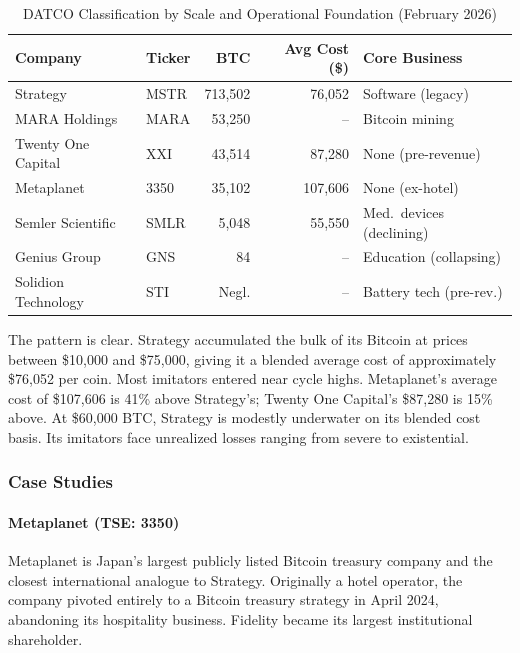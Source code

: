 \begin{table}[H]
\centering
\caption[DATCO Classification by Scale and Operational Foundation]{DATCO Classification by Scale and Operational Foundation (February 2026)}
\label{tab:datco_taxonomy}
\small
\begin{tabular}{@{}llrrl@{}}
\toprule
\textbf{Company} & \textbf{Ticker} & \textbf{BTC} & \textbf{Avg Cost (\$)} & \textbf{Core Business} \\
\midrule
Strategy & MSTR & 713,502 & 76,052 & Software (legacy) \\
MARA Holdings & MARA & 53,250 & -- & Bitcoin mining \\
Twenty One Capital & XXI & 43,514 & 87,280 & None (pre-revenue) \\
Metaplanet & 3350 & 35,102 & 107,606 & None (ex-hotel) \\
Semler Scientific & SMLR & 5,048 & 55,550 & Med.\ devices (declining) \\
Genius Group & GNS & 84 & -- & Education (collapsing) \\
Solidion Technology & STI & Negl. & -- & Battery tech (pre-rev.) \\
\bottomrule
\end{tabular}
\end{table}

The pattern is clear. Strategy accumulated the bulk of its Bitcoin at prices between \$10,000 and \$75,000, giving it a blended average cost of approximately \$76,052 per coin. Most imitators entered near cycle highs. Metaplanet's average cost of \$107,606 is 41\% above Strategy's; Twenty One Capital's \$87,280 is 15\% above. At \$60,000 BTC, Strategy is modestly underwater on its blended cost basis. Its imitators face unrealized losses ranging from severe to existential.

\subsubsection{Case Studies}

\paragraph{Metaplanet (TSE: 3350)}

Metaplanet is Japan's largest publicly listed Bitcoin treasury company and the closest international analogue to Strategy. Originally a hotel operator, the company pivoted entirely to a Bitcoin treasury strategy in April 2024, abandoning its hospitality business. Fidelity became its largest institutional shareholder.


